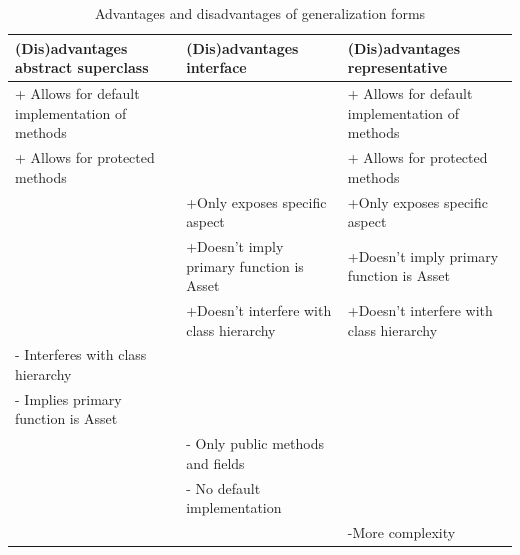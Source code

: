 				\begin{table}
					\begin{tabular}{|p{4cm}|p{4cm}|p{4cm}|}
					\hline
					(Dis)advantages abstract superclass & (Dis)advantages interface & (Dis)advantages representative \\
					\hline
					+ Allows for default implementation of methods&&+ Allows for default implementation of methods\\
					+ Allows for protected methods&&+ Allows for protected methods\\
					&+Only exposes specific aspect&+Only exposes specific aspect\\
					&+Doesn't imply primary function is Asset&+Doesn't imply primary function is Asset\\
					&+Doesn't interfere with class hierarchy&+Doesn't interfere with class hierarchy\\
					\hline
					- Interferes with class hierarchy&&\\
					- Implies primary function is Asset&&\\
					&- Only public methods and fields&\\
					&- No default implementation&\\
					&& -More complexity\\
					\hline
					\end{tabular}

				\caption{Advantages and disadvantages of generalization forms}
				\label{generalization}
				\end{table}
				
